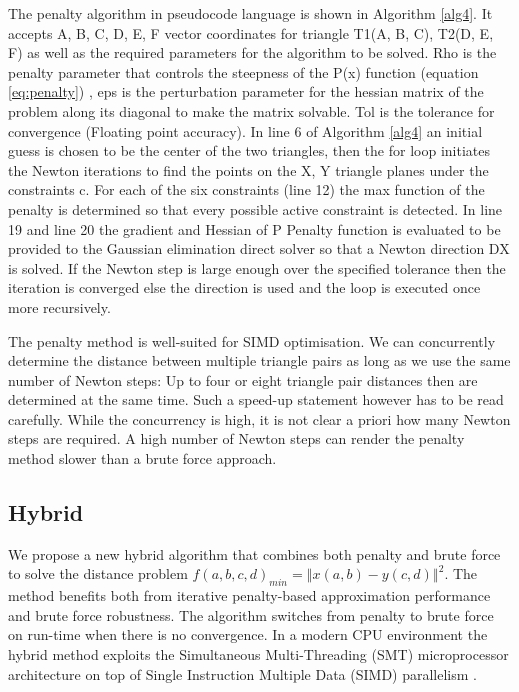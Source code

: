 \documentclass[times,12pt]{article}
\begin{document}
The penalty algorithm in pseudocode language is shown in Algorithm \ref{alg4}. It accepts A, B, C, D, E, F vector coordinates for triangle T1(A, B, C), T2(D, E, F) as well as the required parameters for the algorithm to be solved. Rho is the penalty parameter that controls the steepness of the P(x) function (equation \ref{eq:penalty}) , eps is the perturbation parameter for the hessian matrix of the problem along its diagonal to make the matrix solvable. Tol is the tolerance for convergence (Floating point accuracy). In line 6 of Algorithm \ref{alg4} an initial guess is chosen to be the center of the two triangles, then the for loop initiates the Newton iterations to find the points on the X, Y triangle planes under the constraints c. For each of the six constraints (line 12) the max function of the penalty is determined so that every possible active constraint is detected. In line 19 and line 20 the gradient and Hessian of P Penalty function is evaluated to be provided to the Gaussian elimination direct solver so that a Newton direction DX is solved. If the Newton step is large enough over the specified tolerance then the iteration is converged else the direction is used and the loop is executed once more recursively.

The penalty method is well-suited for SIMD optimisation. We can concurrently determine the distance between multiple triangle pairs as long as we use the same number of Newton steps: Up to four or eight
triangle pair distances then are determined at the same time. Such a speed-up statement however has to be read carefully. While the concurrency is high, it is not clear a priori how many Newton steps are
required. A high number of Newton steps can render the penalty method slower than a brute force approach.

\subsection{Hybrid}
We propose a new hybrid algorithm that combines both penalty and brute force to solve the distance problem $f\left(a,b,c,d\right)_{min}=\left\Vert x\left(a,b\right)-y\left(c,d\right)\right\Vert ^{2}$. The method benefits both from iterative penalty-based approximation performance and brute force robustness. The algorithm switches from penalty to brute force on run-time when there is no convergence. In a modern CPU environment the hybrid method exploits the Simultaneous Multi-Threading (SMT) microprocessor architecture on top of Single Instruction Multiple Data (SIMD) parallelism \cite{Gonnet2014}.
\end{document}
